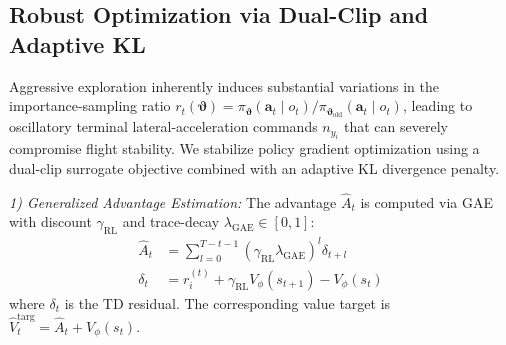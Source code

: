 \documentclass[lettersize,journal]{IEEEtran}
\newcommand{\hladd}[1]{{\color{blue}#1}}
\begin{document}
\subsection{Robust Optimization via Dual-Clip and Adaptive KL}
\label{subsec:dual_clip_kl}

Aggressive exploration inherently induces substantial variations in the importance-sampling ratio \hladd{$r_t(\boldsymbol{\vartheta}) = \pi_{\boldsymbol{\vartheta}}(\mathbf{a}_t \mid o_t) / \pi_{\boldsymbol{\vartheta}_{\mathrm{old}}}(\mathbf{a}_t \mid o_t)$}, leading to oscillatory \hladd{terminal lateral-acceleration commands $n_{y_i}$} that can severely compromise flight stability. We stabilize policy gradient optimization using a dual-clip surrogate objective combined with an adaptive KL divergence penalty.

\emph{1) Generalized Advantage Estimation:} The advantage $\hat{A}_t$ is computed via GAE with discount $\gamma_{\mathrm{RL}}$ and trace-decay $\lambda_{\mathrm{GAE}} \in [0,1]$:
\begin{align}
\hat{A}_t &= \sum_{l=0}^{T-t-1} (\gamma_{\mathrm{RL}}\lambda_{\mathrm{GAE}})^l \delta_{t+l} \label{eq:gae_A} \\
\delta_t &= r_i^{(t)} + \gamma_{\mathrm{RL}} V_\phi(s_{t+1}) - V_\phi(s_t) \label{eq:gae_delta}
\end{align}
where $\delta_t$ is the TD residual. The corresponding value target is $\hat{V}_t^{\mathrm{targ}} = \hat{A}_t + V_\phi(s_t)$.
\end{document}
